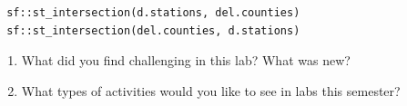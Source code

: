 \documentclass[]{article}
\begin{document}
\begin{verbatim}
 sf::st_intersection(d.stations, del.counties)
 sf::st_intersection(del.counties, d.stations)
\end{verbatim}

\begin{enumerate}
\def\labelenumi{\arabic{enumi}.}
\setcounter{enumi}{1}
\item
  What did you find challenging in this lab? What was new?
\item
  What types of activities would you like to see in labs this semester?
\end{enumerate}
\end{document}

